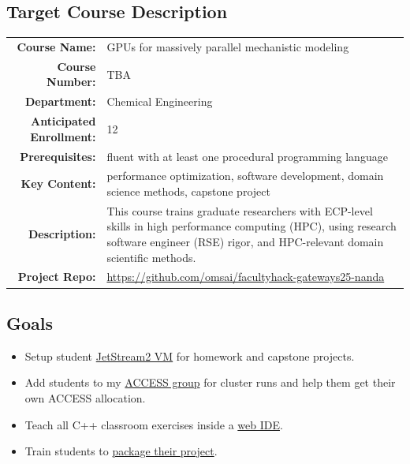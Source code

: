 \documentclass{article}
\begin{document}
\begin{tcbposter}
{  \subsection*{\textcolor{fh-blue}{Target Course Description}}
  \vspace{-.5\baselineskip}
  {
    \begin{tabularx}{\linewidth}{>{\bfseries}r X}
      \toprule
      Course Name:
      & GPUs for massively parallel mechanistic modeling\\
      Course Number:
      & TBA\\
      Department:
      & Chemical Engineering\\
      Anticipated Enrollment:
      & 12\\
      Prerequisites:
      & fluent with at least one %
      procedural programming language\\
      Key Content:
      & performance optimization, %
      software development, %
      domain science methods, %
      capstone project\\
      Description:
      & This course trains graduate researchers %
      with ECP-level skills in high performance computing (HPC), %
      using research software engineer (RSE) rigor, %
      and HPC-relevant domain scientific methods.\\
      Project Repo:
      & \small \url{https://github.com/omsai/facultyhack-gateways25-nanda}\\
      \bottomrule
    \end{tabularx}
  }

  \vspace{-\baselineskip}
  \subsection*{\textcolor{fh-blue}{Goals}}
  \vspace{-.5\baselineskip}
  \begin{itemize}
  \setlength{\itemsep}{-.5em}
  \item Setup student \ul{JetStream2 VM} for homework and capstone projects.
  \item Add students to my \ul{ACCESS group} for cluster runs and %
    help them get their own ACCESS allocation.
  \item Teach all C++ classroom exercises inside a \ul{web IDE}.
  \item Train students to \ul{package their project}.
  \end{itemize}
  }


\end{tcbposter}
\end{document}
